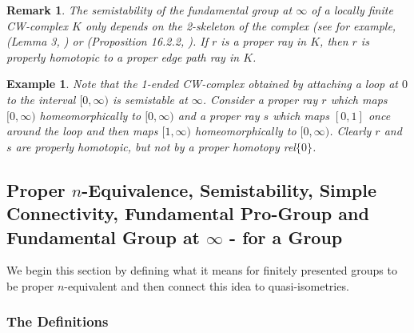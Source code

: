 \documentclass[12pt]{article}
\newtheorem{remark}[theorem]{Remark}
\newtheorem{example}[theorem]{Example}
\begin{document}
\begin{remark} 
 The semistability of the fundamental group at $\infty$ of a locally
finite CW-complex $K$ only depends on the 2-skeleton of the complex (see for
example, (Lemma 3, \cite{LR75}) or (Proposition 16.2.2, \cite{G}). If $r$ is a proper ray in $K$, then $r$ is properly homotopic to a proper edge path ray in $K$. 
\end{remark}


\begin{example}
Note that the 1-ended CW-complex obtained by attaching a loop at $0$ to the interval $[0,\infty)$ is  semistable at $\infty$. Consider a proper ray $r$ which maps $[0,\infty)$ homeomorphically to $[0,\infty) $ and a proper ray $s$ which maps $[0,1]$ once around the loop and then maps  $[1,\infty)$ homeomorphically to $[0,\infty)$. Clearly $r$ and $s$ are properly homotopic, but not by a proper homotopy rel$\{0\}$. 
\end{example}

\newpage








\subsection{Proper $n$-Equivalence, Semistability, Simple Connectivity, Fundamental Pro-Group and Fundamental Group at $\infty$ - for a Group}\label{SSproGp}

We begin this section by defining what it means for finitely presented groups to be proper $n$-equivalent and then connect this idea to quasi-isometries. 

\subsubsection{The Definitions} \label{Pr2eq} 
\end{document}
